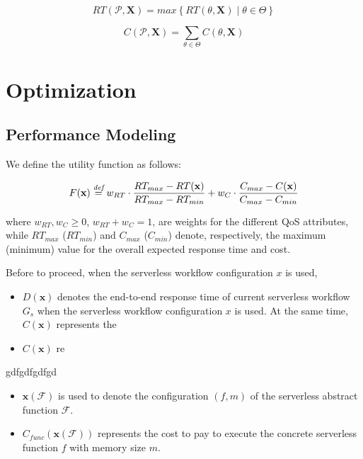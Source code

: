 \begin{equation}
	RT(\mathcal{P}, \textbf{X}) = max \left\lbrace RT(\mathcal{\theta}, \textbf{X}) \mid \theta \in \Theta \right\rbrace 
\end{equation}

\begin{equation}
	C(\mathcal{P}, \textbf{X}) = \sum_{\theta \in \Theta} C(\theta, \textbf{X})
\end{equation}


\section{Optimization}


\subsection{Performance Modeling}






We define the utility function as follows:

\begin{equation}
	F(\textbf{x}) \overset{\textit{def}}{=} w_{RT} \cdot \dfrac{RT_{max} - RT(\textbf{x})}{RT_{max} - RT_{min}} + w_{C} \cdot \dfrac{C_{max} - C(\textbf{x})}{C_{max} - C_{min}}
\end{equation}

where $w_{RT}, w_{C} \geq 0$, $w_{RT} + w_{C} = 1$, are weights for the different QoS attributes, while $RT_{max}$ ($RT_{min}$) and $C_{max}$ ($C_{min}$) denote, respectively, the maximum (minimum) value for the overall expected response time and cost.






Before to proceed, when the serverless workflow configuration $x$ is used,




\begin{itemize}
	\item $D(\textbf{x})$ denotes the end-to-end response time of current serverless workflow $G_s$ when the serverless workflow configuration $x$ is used. At the same time, $C(\textbf{x})$ represents the  
	\item $C(\textbf{x})$ re
\end{itemize}

gdfgdfgdfgd

\begin{itemize}
	\item $\textbf{x}(\mathscr{F})$ is used to denote the configuration $\left( f, m \right) $ of the serverless abstract function $\mathscr{F}$.
	\item $C_{func}(\textbf{x}(\mathscr{F}))$ represents the cost to pay to execute the concrete serverless function $f$ with memory size $m$.
\end{itemize}




